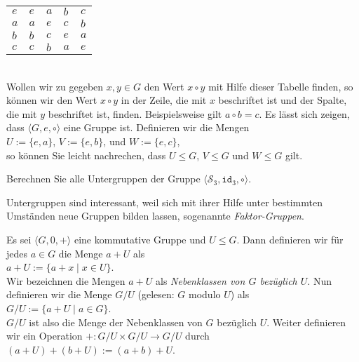 \begin{enumerate}
\begin{tabular}[t]{l|llll}
      \hline
          $e$ & $e$ & $a$ & $b$ & $c$ \\
          $a$ & $a$ & $e$ & $c$ & $b$ \\
          $b$ & $b$ & $c$ & $e$ & $a$ \\
          $c$ & $c$ & $b$ & $a$ & $e$ \\
      \end{tabular}
      \\[0.2cm]
      Wollen wir zu gegeben $x,y \in G$ den Wert $x \circ y$ mit Hilfe dieser Tabelle finden, so k\"{o}nnen
      wir den Wert $x \circ y$ in der Zeile, die mit $x$ beschriftet ist und der Spalte, die mit $y$
      beschriftet ist, finden.  Beispielsweise gilt $a \circ b = c$.  Es l\"{a}sst sich zeigen, dass
      $\langle G, e, \circ \rangle$ eine Gruppe ist.  Definieren wir die Mengen
      \\[0.2cm]
      \hspace*{1.3cm} $U := \{ e, a \}$, \quad $V := \{ e, b \}$, \quad und \quad $W := \{ e, c \}$, 
      \\[0.2cm]
      so k\"{o}nnen Sie leicht nachrechen, dass 
      $U \leq G$, $V \leq G$ und $W \leq G$ gilt.
      \eox
\end{enumerate}

\exercise
Berechnen Sie alle Untergruppen der Gruppe $\langle \mathcal{S}_3, \mathtt{id}_3, \circ \rangle$.
\exend
\vspace*{0.3cm}

Untergruppen sind interessant, weil sich mit ihrer Hilfe unter bestimmten Umst\"{a}nden 
neue Gruppen bilden lassen, sogenannte \emph{Faktor-Gruppen}.

\begin{Definition}
  Es sei $\langle G, 0, + \rangle$ eine kommutative Gruppe und $U \leq G$.
  Dann definieren wir f\"{u}r jedes $a \in G$ die Menge $a + U$ als
  \\[0.2cm]
  \hspace*{1.3cm}
  $a + U := \{ a + x \mid x \in U \}$.
  \\[0.2cm]
  Wir bezeichnen die Mengen $a + U$ als \emph{Nebenklassen von $G$ bez\"{u}glich $U$}.
  Nun definieren wir die Menge $G/U$ (gelesen: $G$ modulo $U$) als
  \\[0.2cm]
  \hspace*{1.3cm}
  $G/U := \bigl\{ a + U \mid a \in G \bigr\}$.
  \\[0.2cm]
  $G/U$ ist also die Menge der Nebenklassen von $G$ bez\"{u}glich $U$.
  Weiter definieren wir ein Operation $+: G/U \times G/U \rightarrow G/U$ durch
  \\[0.2cm]
  \hspace*{1.3cm}
  $(a + U) + (b + U) := (a + b) + U$.
\end{Definition}

